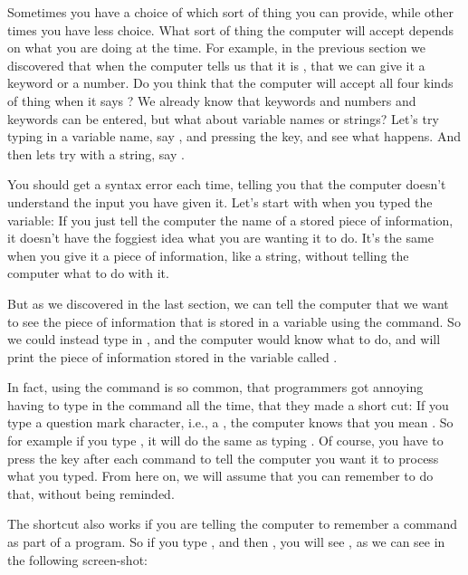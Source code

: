 \needspace{4cm} %
Sometimes you have a choice of which sort of thing you can provide, while other times you have less choice. What
sort of thing the computer will accept depends on what you are doing at the time.  For example, in the previous
section we discovered that when the computer tells us that it is , that we can give it
a keyword or a number.  Do you think that the computer will accept all four kinds of thing when it says
?  We already know that keywords and numbers and keywords can be entered, but what about
variable names or strings?  Let's try typing in a variable name, say , and pressing the  key,
and see what happens.  And then lets try with a string, say .


You should get a syntax error each time, telling you that the computer doesn't understand the input you have given it.
Let's start with when you typed the variable: If you just tell the computer the name of a stored piece of information,
it doesn't have the foggiest idea what you are wanting it to do.  It's the same when you give it a piece of information,
like a string, without telling the computer what to do with it.

But as we discovered in the last section, we can tell the computer that we want to see the piece of information that is
stored in a variable using the  command.  So we could instead type in , and
the computer would know what to do, and will print the piece of information stored in the variable called .

In fact, using the  command is so common, that programmers got annoying having to type in the 
command all the time, that they made a short cut: If you type a question mark character, i.e., a , the computer
knows that you mean .  So for example if you type , it will do the same as typing
.  Of course, you have to press the  key after each command to tell the computer
you want it to process what you typed.  From here on, we will assume that you can remember to do that, without being reminded.

\needspace{4cm} %
The  shortcut also works if you are telling the computer to remember a command as part of a program.
So if you type , and then , you will see , as we can see
in the following screen-shot:

